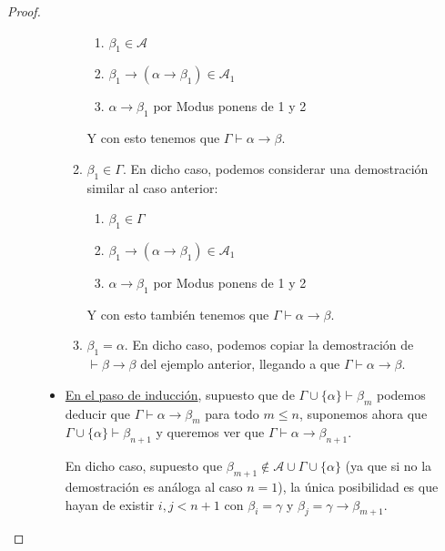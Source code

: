 \begin{teo}
\begin{proof}
\begin{description}
\begin{itemize}
\begin{enumerate}[label=(\alph*)]
\begin{enumerate}[label=\arabic*.]
                                    \item $\beta_1\in \mathcal{A}$
                                    \item $\beta_1\to(\alpha\to\beta_1)\in \mathcal{A}_1$
                                    \item $\alpha\to\beta_1$ por Modus ponens de 1 y 2
                                \end{enumerate}
                                Y con esto tenemos que $\Gamma\vdash \alpha\to\beta$.
                            \item $\beta_1\in \Gamma$. En dicho caso, podemos considerar una demostración similar al caso anterior:
                                \begin{enumerate}[label=\arabic*.]
                                    \item $\beta_1\in \Gamma$
                                    \item $\beta_1\to(\alpha\to\beta_1)\in \mathcal{A}_1$
                                    \item $\alpha\to\beta_1$ por Modus ponens de 1 y 2
                                \end{enumerate}
                                Y con esto también tenemos que $\Gamma\vdash \alpha\to\beta$.
                            \item $\beta_1=\alpha$. En dicho caso, podemos copiar la demostración de $\vdash \beta\to\beta$ del ejemplo anterior, llegando a que $\Gamma\vdash \alpha\to\beta$.
                        \end{enumerate}
                    \item \underline{En el paso de inducción}, supuesto que de $\Gamma\cup\{\alpha\}\vdash \beta_m$ podemos deducir que $\Gamma\vdash \alpha\to\beta_m$ para todo $m\leq n$, suponemos ahora que $\Gamma\cup\{\alpha\}\vdash \beta_{n+1}$ y queremos ver que $\Gamma\vdash \alpha\to\beta_{n+1}$.

                        En dicho caso, supuesto que $\beta_{m+1}\notin \mathcal{A}\cup\Gamma\cup\{\alpha\}$ (ya que si no la demostración es análoga al caso $n=1$), la única posibilidad es que hayan de existir $i,j<n+1$ con $\beta_i=\gamma$ y $\beta_j=\gamma\to\beta_{m+1}$.


\end{itemize}
\end{description}
\end{proof}
\end{teo}
